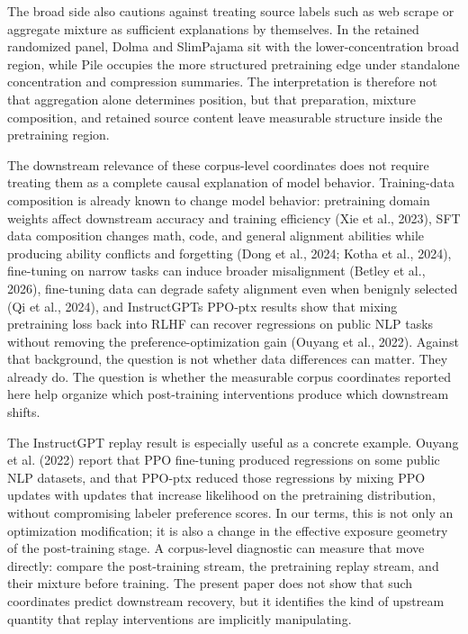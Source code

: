 \documentclass[11pt]{article}
\begin{document}
The broad side also cautions against treating source labels such as web scrape or aggregate mixture as sufficient explanations by themselves. In the retained randomized panel, Dolma and SlimPajama sit with the lower-concentration broad region, while Pile occupies the more structured pretraining edge under standalone concentration and compression summaries. The interpretation is therefore not that aggregation alone determines position, but that preparation, mixture composition, and retained source content leave measurable structure inside the pretraining region.

The downstream relevance of these corpus-level coordinates does not require treating them as a complete causal explanation of model behavior. Training-data composition is already known to change model behavior: pretraining domain weights affect downstream accuracy and training efficiency (Xie et al., 2023), SFT data composition changes math, code, and general alignment abilities while producing ability conflicts and forgetting (Dong et al., 2024; Kotha et al., 2024), fine-tuning on narrow tasks can induce broader misalignment (Betley et al., 2026), fine-tuning data can degrade safety alignment even when benignly selected (Qi et al., 2024), and InstructGPT\textquotesingle s PPO-ptx results show that mixing pretraining loss back into RLHF can recover regressions on public NLP tasks without removing the preference-optimization gain (Ouyang et al., 2022). Against that background, the question is not whether data differences can matter. They already do. The question is whether the measurable corpus coordinates reported here help organize which post-training interventions produce which downstream shifts.

The InstructGPT replay result is especially useful as a concrete example. Ouyang et al. (2022) report that PPO fine-tuning produced regressions on some public NLP datasets, and that PPO-ptx reduced those regressions by mixing PPO updates with updates that increase likelihood on the pretraining distribution, without compromising labeler preference scores. In our terms, this is not only an optimization modification; it is also a change in the effective exposure geometry of the post-training stage. A corpus-level diagnostic can measure that move directly: compare the post-training stream, the pretraining replay stream, and their mixture before training. The present paper does not show that such coordinates predict downstream recovery, but it identifies the kind of upstream quantity that replay interventions are implicitly manipulating.
\end{document}
